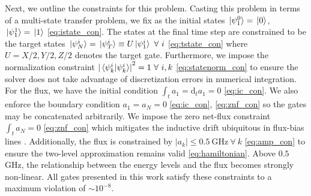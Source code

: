 \documentclass[
  amsfonts,
  amsmath,
  amssymb,
  pra,
  twocolumn,
  superscriptaddress,
]{revtex4-2}
\begin{document}
Next, we outline the constraints for this problem.
Casting this problem in terms of a multi-state transfer problem, we fix as the initial states
 $\ket*{\psi^{0}_{1}} = \ket*{0}$, $\ket*{\psi^{1}_{1}} = \ket*{1}$
\eqref{eq:istate_con}.
The states at the final time step are constrained to be
the target states $\ket*{\psi^{i}_{N}} = \ket*{\psi^{i}_{T}} \equiv
U \ket*{\psi^{i}_{1}} \ \forall \ i$
\eqref{eq:tstate_con} where $U = X/2, Y/2, Z/2$ denotes the target gate.
Furthermore, we impose the normalization constraint
${\lvert \braket*{\psi^{i}_{k}}{\psi^{i}_{k}} \rvert}^{2} = 1 \ \forall \ i,k$
\eqref{eq:statenorm_con}
to ensure the solver does not take advantage of discretization errors in numerical integration.
For the flux,
we have the initial condition $\int_{t} a_{1} = \mathrm{d}_{t} a_{1} = 0$
\eqref{eq:ic_con}.
We also enforce the boundary condition $a_{1} = a_{N} = 0$ \eqref{eq:ic_con}, \eqref{eq:znf_con}
so the gates may be concatenated arbitrarily. 
We impose the zero net-flux constraint $\int_{t} a_{N} = 0$
\eqref{eq:znf_con}
which mitigates the inductive drift ubiquitous in flux-bias lines
\cite{battistel2019fast, krantz2019quantum, zhang2020universal}.
Additionally, the flux is constrained by $\lvert a_{k} \rvert \leq 0.5 \ \textrm{GHz}
\ \forall \ k$ \eqref{eq:amp_con} to ensure the two-level
approximation remains valid \eqref{eq:hamiltonian}. Above $0.5$ GHz,
the relationship between the energy levels and the flux becomes strongly non-linear.
All gates presented in this work satisfy these constraints to
a maximum violation of $\sim 10^{-8}$.
\end{document}
